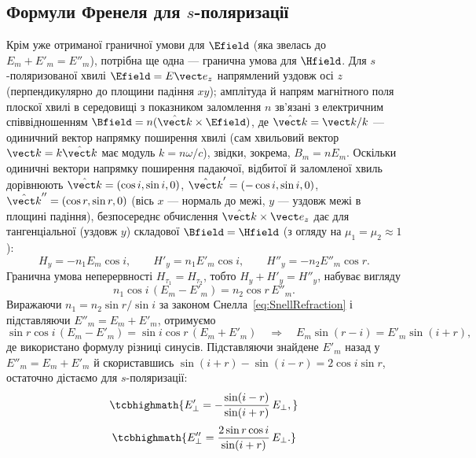 \subsection*{Формули Френеля для $s$-поляризації}

Крім уже отриманої граничної умови для $\Efield$ (яка звелась до $E_m+E'_m=E''_m$), потрібна ще одна --- гранична умова для $\Hfield$. Для
$s$-поляризованої хвилі $\Efield=E\vect e_z$ напрямлений уздовж осі $z$ (перпендикулярно до площини падіння $xy$); амплітуда й напрям
магнітного поля плоскої хвилі в середовищі з показником заломлення $n$ зв'язані з електричним співвідношенням $\Bfield=n(\hat{\vect
k}\times\Efield)$, де $\hat{\vect k}=\vect k/k$ --- одиничний вектор напрямку поширення хвилі (сам хвильовий вектор $\vect k=k\hat{\vect k}$ має
модуль $k=n\omega/c$), звідки, зокрема, $B_m=nE_m$. Оскільки одиничні вектори напрямку поширення падаючої, відбитої й заломленої хвиль дорівнюють $\hat{\vect
k}=(\cos i,\sin i,0)$, $\hat{\vect k}'=(-\cos i,\sin i,0)$, $\hat{\vect k}''=(\cos r,\sin r,0)$ (вісь $x$ --- нормаль до межі, $y$ --- уздовж
межі в площині падіння), безпосереднє обчислення $\hat{\vect k}\times\vect e_z$ дає для тангенціальної (уздовж $y$) складової $\Bfield=\Hfield$
(з огляду на $\mu_1=\mu_2\approx1$):
\begin{equation*}
	H_y = -n_1E_m\cos i, \qquad H'_y = n_1E'_m\cos i, \qquad H''_y = -n_2E''_m\cos r.
\end{equation*}
Гранична умова неперервності $H_{\tau_1}=H_{\tau_2}$, тобто $H_y+H'_y=H''_y$, набуває вигляду
\begin{equation}\label{eq:FresnelSBoundaryH}
	n_1\cos i\,(E_m-E'_m) = n_2\cos r\,E''_m.
\end{equation}
Виражаючи $n_1=n_2\sin r/\sin i$ за законом Снелла~\eqref{eq:SnellRefraction} і підставляючи $E''_m=E_m+E'_m$, отримуємо
\begin{equation*}
	\sin r\cos i\,(E_m-E'_m) = \sin i\cos r\,(E_m+E'_m) \quad\Longrightarrow\quad E_m\sin(r-i) = E'_m\sin(i+r),
\end{equation*}
де використано формулу різниці синусів. Підставляючи знайдене $E'_m$ назад у $E''_m=E_m+E'_m$ й скориставшись
$\sin(i+r)-\sin(i-r)=2\cos i\sin r$, остаточно дістаємо  для $s$-поляризації:
\begin{equation}\label{eq:FresnelSReflection}
	\tcbhighmath{
		E'_\perp = -\frac{\sin(i-r)}{\sin(i+r)}\, E_\perp,
	}
\end{equation}
\begin{equation}\label{eq:FresnelSTransmission}
	\tcbhighmath{
		E''_\perp = \frac{2\sin r\cos i}{\sin(i+r)}\, E_\perp.
	}
\end{equation}

